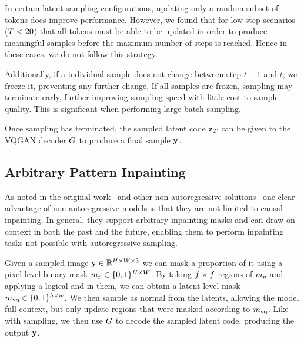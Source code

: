 In certain latent sampling configurations, updating only a random subset of
tokens does improve performance. However, we found that for low step scenarios
($T<20$) that all tokens must be able to be updated in order to
produce meaningful samples before the maximum number of steps is reached. Hence
in these cases, we do not follow this strategy.

Additionally, if a individual sample does not change between step $t-1$ and $t$,
we freeze it, preventing any further change. If all samples are frozen, sampling
may terminate early, further improving sampling speed with little cost to
sample quality. This is significant when performing large-batch sampling.

Once sampling has terminated, the sampled latent code $\mathbf{z}_T$ can be given
to the VQGAN decoder $G$ to produce a final sample $\mathbf{y}$.

\subsection{Arbitrary Pattern Inpainting}

As noted in the original work~\cite{savinov2022stepunrolled} and other
non-autoregressive solutions~\cite{bondtaylor2021unleashing} one clear advantage
of non-autoregressive models is that they are not limited to causal inpainting.
In general, they support arbitrary inpainting masks and can draw on context in
both the past and the future, enabling them to perform inpainting tasks not
possible with autoregressive sampling.

Given a sampled image $\mathbf{y} \in \mathbb{R}^{H \times W \times 3}$ we can mask a
proportion of it using a pixel-level binary mask $m_p \in \{0, 1\}^{H
\times W}$. By taking $f \times f$ regions of
$m_p$ and applying a logical and in them, we can obtain a latent level
mask $m_\textrm{vq} \in \{0,1\}^{h \times w}$. We then sample as normal from the
latents, allowing the model full context, but only update regions that were
masked according to $m_\textrm{vq}$. Like with sampling, we then use $G$
to decode the sampled latent code, producing the output $\mathbf{y}$.
